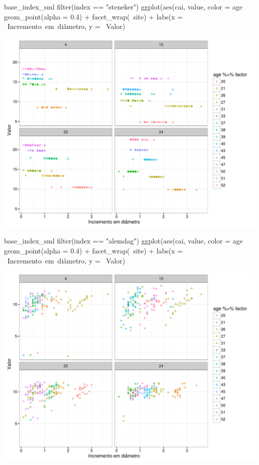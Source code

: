\documentclass[article]{jss}
\begin{document}
\begin{CodeChunk}
\begin{CodeInput}
base_index_sml %
  filter(index == "steneker") %
  ggplot(aes(cai, value, color = age %
    geom_point(alpha = 0.4) +
    facet_wrap(~site) +
    labs(x = ~Incremento~em~diâmetro, y = ~Valor)
\end{CodeInput}


\begin{center}\includegraphics{comp3-paper_files/figure-latex/unnamed-chunk-16-1} \end{center}

\end{CodeChunk}

\begin{CodeChunk}
\begin{CodeInput}
base_index_sml %
  filter(index == "alemdag") %
  ggplot(aes(cai, value, color = age %
    geom_point(alpha = 0.4) +
    facet_wrap(~site) +
    labs(x = ~Incremento~em~diâmetro, y = ~Valor)
\end{CodeInput}


\begin{center}\includegraphics{comp3-paper_files/figure-latex/unnamed-chunk-17-1} \end{center}

\end{CodeChunk}
\end{document}
